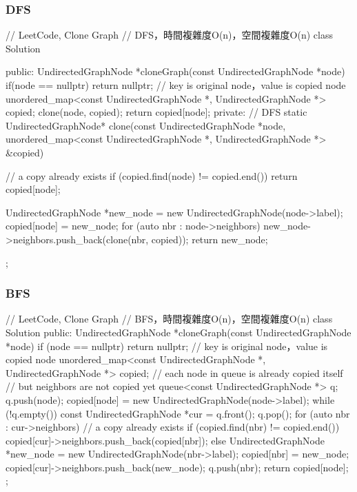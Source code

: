 \subsubsection{DFS}
\begin{Code}
// LeetCode, Clone Graph
// DFS，時間複雜度O(n)，空間複雜度O(n)
class Solution {
public:
    UndirectedGraphNode *cloneGraph(const UndirectedGraphNode *node) {
        if(node == nullptr) return nullptr;
        // key is original node，value is copied node
        unordered_map<const UndirectedGraphNode *,
                            UndirectedGraphNode *> copied;
        clone(node, copied);
        return copied[node];
    }
private:
    // DFS
    static UndirectedGraphNode* clone(const UndirectedGraphNode *node,
            unordered_map<const UndirectedGraphNode *,
            UndirectedGraphNode *> &copied) {
        // a copy already exists
        if (copied.find(node) != copied.end()) return copied[node];

        UndirectedGraphNode *new_node = new UndirectedGraphNode(node->label);
        copied[node] = new_node;
        for (auto nbr : node->neighbors)
            new_node->neighbors.push_back(clone(nbr, copied));
        return new_node;
    }
};
\end{Code}


\subsubsection{BFS}
\begin{Code}
// LeetCode, Clone Graph
// BFS，時間複雜度O(n)，空間複雜度O(n)
class Solution {
public:
    UndirectedGraphNode *cloneGraph(const UndirectedGraphNode *node) {
        if (node == nullptr) return nullptr;
        // key is original node，value is copied node
        unordered_map<const UndirectedGraphNode *,
                            UndirectedGraphNode *> copied;
        // each node in queue is already copied itself
        // but neighbors are not copied yet
        queue<const UndirectedGraphNode *> q;
        q.push(node);
        copied[node] = new UndirectedGraphNode(node->label);
        while (!q.empty()) {
            const UndirectedGraphNode *cur = q.front();
            q.pop();
            for (auto nbr : cur->neighbors) {
                // a copy already exists
                if (copied.find(nbr) != copied.end()) {
                    copied[cur]->neighbors.push_back(copied[nbr]);
                } else {
                    UndirectedGraphNode *new_node =
                            new UndirectedGraphNode(nbr->label);
                    copied[nbr] = new_node;
                    copied[cur]->neighbors.push_back(new_node);
                    q.push(nbr);
                }
            }
        }
        return copied[node];
    }
};
\end{Code}


